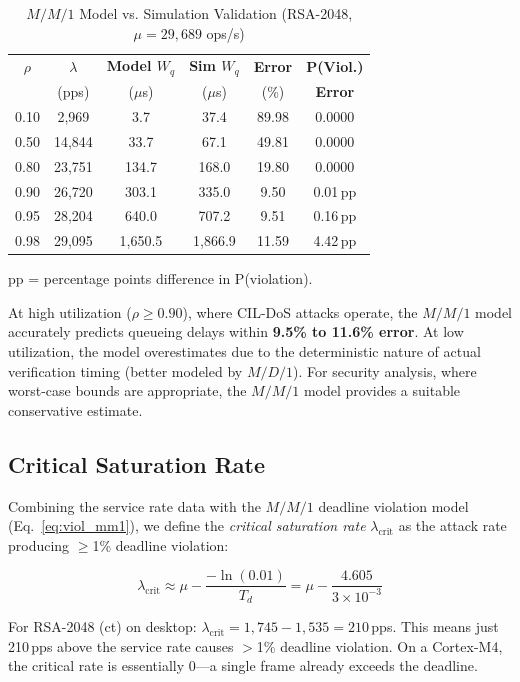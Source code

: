 \documentclass{ieeeaccess}
\begin{document}
\begin{table}[t]
\caption{$M/M/1$ Model vs. Simulation Validation (RSA-2048, $\mu = 29{,}689$ ops/s)}
\label{tab:queue_validation}
\centering
\small
\begin{tabular}{cccccc}
\toprule
$\rho$ & $\lambda$ & \textbf{Model $W_q$} & \textbf{Sim $W_q$} & \textbf{Error} & \textbf{P(Viol.)} \\
 & (pps) & ($\mu$s) & ($\mu$s) & (\%) & \textbf{Error} \\
\midrule
0.10 & 2,969  & 3.7    & 37.4  & 89.98 & 0.0000 \\
0.50 & 14,844 & 33.7   & 67.1  & 49.81 & 0.0000 \\
0.80 & 23,751 & 134.7  & 168.0 & 19.80 & 0.0000 \\
0.90 & 26,720 & 303.1  & 335.0 & 9.50  & 0.01\,pp \\
0.95 & 28,204 & 640.0  & 707.2 & 9.51  & 0.16\,pp \\
0.98 & 29,095 & 1,650.5 & 1,866.9 & 11.59 & 4.42\,pp \\
\bottomrule
\end{tabular}
\vspace{1mm}
\small{pp = percentage points difference in P(violation).}
\end{table}

At high utilization ($\rho \geq 0.90$), where CIL-DoS attacks operate, the $M/M/1$ model accurately predicts queueing delays within \textbf{9.5\% to 11.6\% error}. At low utilization, the model overestimates due to the deterministic nature of actual verification timing (better modeled by $M/D/1$). For security analysis, where worst-case bounds are appropriate, the $M/M/1$ model provides a suitable conservative estimate.

\subsection{Critical Saturation Rate}
Combining the service rate data with the $M/M/1$ deadline violation model (Eq.~\ref{eq:viol_mm1}), we define the \emph{critical saturation rate} $\lambda_{\text{crit}}$ as the attack rate producing $\geq$1\% deadline violation:

\begin{equation}
\lambda_{\text{crit}} \approx \mu - \frac{-\ln(0.01)}{T_d} = \mu - \frac{4.605}{3 \times 10^{-3}}
\end{equation}

For RSA-2048 (ct) on desktop: $\lambda_{\text{crit}} = 1{,}745 - 1{,}535 = 210$\,pps. This means just 210\,pps above the service rate causes $>$1\% deadline violation. On a Cortex-M4, the critical rate is essentially 0---a single frame already exceeds the deadline.
\end{document}
